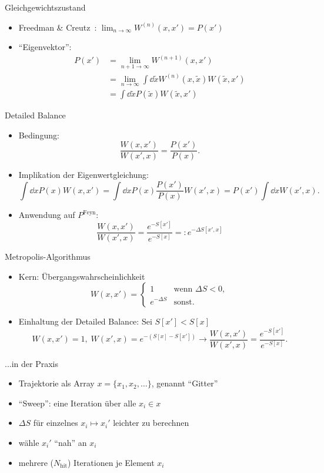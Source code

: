 \documentclass[ngerman]{beamer}
\begin{document}
\begin{frame}{Gleichgewichtszustand}
\begin{itemize}
	\item Freedman \& Creutz~\cite{freedmanCreutz}: $\lim_{n \rightarrow \infty} W^{(n)}(x,x') = P(x')$
	\item \enquote{Eigenvektor}:
	\begin{align*}
	P(x') 
	&= \lim_{n+1 \rightarrow \infty} W^{(n+1)}(x,x') \\
	&= \lim_{n \rightarrow \infty} \int \dd{\tilde{x}} W^{(n)}(x, \tilde{x}) W(\tilde{x},x')\\
	&= \int \dd{\tilde{x}} P(\tilde{x}) W(\tilde{x},x')
	\end{align*}
\end{itemize}
\end{frame}

\begin{frame}{Detailed Balance}
\begin{itemize}
	\item Bedingung:
	\[
	\frac{W(x,x')}{W(x',x)} = \frac{P(x')}{P(x)}.
	\]
	\item Implikation der Eigenwertgleichung:
	\[
	\int \dd{x} P(x) W(x,x') = \int \dd{x} P(x) \frac{P(x')}{P(x)} W(x',x)
	= P(x') \int \dd{x} W(x',x).
	\]
	\item Anwendung auf $P^\text{Feyn}$:
	\[
	\frac{W(x,x')}{W(x',x)} = \frac{e^{-S[x']}}{e^{-S[x]}}
	=: e^{-\Delta S[x',x]}
	\]	
\end{itemize}
\end{frame}

\begin{frame}{Metropolis-Algorithmus}
\begin{itemize}
	\item Kern: Übergangswahrscheinlichkeit
	\[
	W(x,x') =
	\begin{cases}
	1 & \text{wenn } \Delta S < 0, \\
	e^{-\Delta S} & \text{sonst}.
	\end{cases}
	\]
	\item Einhaltung der Detailed Balance: Sei $S[x'] < S[x]$
	\[
	W(x,x') = 1, \; W(x',x) = e^{-\left( S[x] - S[x'] \right)}
	\rightarrow \frac{W(x,x')}{W(x',x)} = \frac{e^{-S[x']}}{e^{-S[x]}}.
	\]
\end{itemize}
\end{frame}

\begin{frame}{...in der Praxis}
\begin{itemize}
	\item Trajektorie als Array $x = \{x_1, x_2, \dots \}$, genannt \enquote{Gitter}
	\item \enquote{Sweep}: eine Iteration über alle $x_i \in x$
	\item $\Delta S$ für einzelnes $x_i \mapsto x_i'$ leichter zu berechnen
	\item wähle $x_i'$ \enquote{nah} an $x_i$
	\item mehrere ($N_\text{hit}$) Iterationen je Element $x_i$
\end{itemize}
\end{frame}
\end{document}
